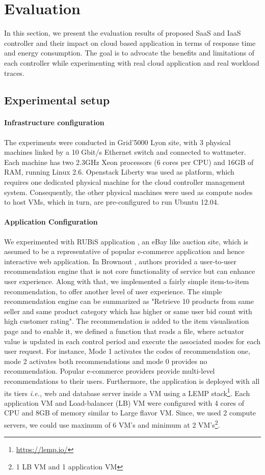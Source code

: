 \section{Evaluation}
In this section, we present the evaluation results of proposed SaaS and IaaS controller and their impact on cloud based application
in terms of response time and energy consumption. The goal is to advocate the benefits
and limitations of each controller while experimenting
with real cloud application and real workload traces.

\subsection{Experimental setup}
\paragraph*{\textbf{Infrastructure configuration}}The experiments were conducted in Grid'5000 Lyon site,
with 3 physical machines linked by a 10 Gbit/s Ethernet
switch and connected to wattmeter. Each machine has two
2.3GHz Xeon processors (6 cores per CPU) and 16GB of
RAM, running Linux 2.6. Openstack Liberty was used
as platform, which requires one dedicated physical machine
for the cloud controller management system. Consequently,
the other physical machines were used as compute nodes to
host VMs, which in turn, are pre-configured to run Ubuntu
12.04.

\paragraph*{\textbf{Application Configuration}} We experimented with
RUBiS application \cite{rubis}, an eBay like auction site, which
is assumed to be a representative of popular e-commerce application 
and hence interactive web application. In Brownout \cite{brownout}, authors provided a user-to-user recommendation engine that is not core functionality of service but can enhance user experience. Along with that, we implemented a fairly simple item-to-item recommendation, to offer another level of user experience. The
simple recommendation engine can be summarized as "Retrieve 10 products from same seller and same product category which has higher or same user bid count with high customer rating". The recommendation is added
to the item visualisation page and to enable it, we defined
a function that reads a file, where actuator value is updated
in each control period and execute the associated modes for
each user request. For instance, Mode 1 activates the codes of
recommendation one, mode 2 activates both recommendations
and mode 0 provides no recommendation. Popular e-commerce providers provide multi-level recommendations to their users. Furthermore, the application is deployed with all its tiers \emph{i.e.,} web and database server inside a VM using a LEMP stack\footnote{\url{https://lemp.io/}}. Each application VM and Load-balancer (LB) VM were configured with 4 cores of CPU and 8GB of memory similar to Large flavor VM. Since, we used 2 compute servers, we could use maximum of 6 VM's and minimum at 2 VM's\footnote{1 LB VM and 1 application VM}. 

